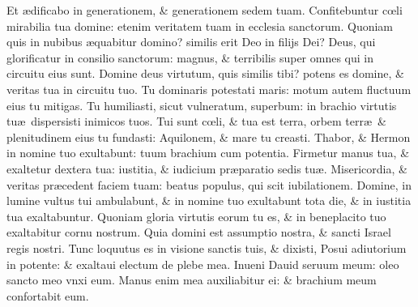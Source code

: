 \documentclass[a5paper,10pt]{book}
\def\ae{æ}
\def\oe{œ}
\begin{document}
\begin{multicols*}{2}
\newline \color{red} E\color{black}t \ae dificabo in generationem, \& generationem sedem tuam.
\newline \color{red} C\color{black}onfitebuntur c\oe li mirabilia tua domine: etenim veritatem tuam in ecclesia sanctorum.
\newline \color{red} Q\color{black}uoniam quis in nubibus \ae quabitur domino? similis erit Deo in filijs Dei?
\newline \color{red} D\color{black}eus, qui glorificatur in consilio sanctorum: magnus, \& terribilis super omnes qui in circuitu eius sunt.
\newline \color{red} D\color{black}omine deus virtutum, quis similis tibi? potens es domine, \& veritas tua in circuitu tuo.
\newline \color{red} T\color{black}u dominaris potestati maris: motum autem fluctuum eius tu mitigas.
\newline \color{red} T\color{black}u humiliasti, sicut vulneratum, superbum: in brachio virtutis tu\ae \ dispersisti inimicos tuos.
\newline \color{red} T\color{black}ui sunt c\oe li, \& tua est terra, orbem terr\ae \ \& plenitudinem eius tu fundasti: Aquilonem, \& mare tu creasti.
\newline \color{red} T\color{black}habor, \& Hermon in nomine tuo exultabunt: tuum brachium cum potentia.
\newline \color{red} F\color{black}irmetur manus tua, \& exaltetur dextera tua: iustitia, \& iudicium pr\ae paratio sedis tu\ae .
\newline \color{red} M\color{black}isericordia, \& veritas pr\ae cedent faciem tuam: beatus populus, qui scit iubilationem.
\newline \color{red} D\color{black}omine, in lumine vultus tui ambulabunt, \& in nomine tuo exultabunt tota die, \& in iustitia tua exaltabuntur.
\newline \color{red} Q\color{black}uoniam gloria virtutis eorum tu es, \& in beneplacito tuo exaltabitur cornu nostrum.
\newline \color{red} Q\color{black}uia domini est assumptio nostra, \& sancti Israel regis nostri.
\newline \color{red} T\color{black}unc loquutus es in visione sanctis tuis, \& dixisti, Posui adiutorium in potente: \& exaltaui electum de plebe mea.
\newline \color{red} I\color{black}nueni Dauid seruum meum: oleo sancto meo vnxi eum.
\newline \color{red} M\color{black}anus enim mea auxiliabitur ei: \& brachium meum confortabit eum.

\end{multicols*}
\end{document}
